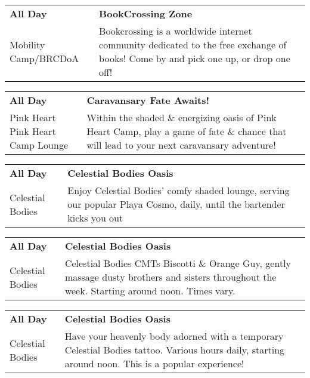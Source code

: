 \begin{tabular}{ p{1in} p{2.2in} }
    \textbf{All Day} & \textbf{BookCrossing Zone} \\
    Mobility Camp/BRCDoA \newline  & Bookcrossing is a worldwide internet community dedicated to the free exchange of books! Come by and pick one up, or drop one off! \\
    \hline 
\end{tabular}
    
\begin{tabular}{ p{1in} p{2.2in} }
    \textbf{All Day} & \textbf{Caravansary Fate Awaits!} \\
    Pink Heart \newline Pink Heart Camp Lounge & Within the shaded \& energizing oasis of Pink Heart Camp, play a game of fate \& chance that will lead to your next caravansary adventure! \\
    \hline 
\end{tabular}
    
\begin{tabular}{ p{1in} p{2.2in} }
    \textbf{All Day} & \textbf{Celestial Bodies Oasis} \\
    Celestial Bodies \newline  & Enjoy Celestial Bodies' comfy shaded lounge, serving our popular Playa Cosmo, daily, until the bartender kicks you out {\char9786} \\
    \hline 
\end{tabular}
    
\begin{tabular}{ p{1in} p{2.2in} }
    \textbf{All Day} & \textbf{Celestial Bodies Oasis} \\
    Celestial Bodies \newline  & Celestial Bodies CMTs Biscotti \& Orange Guy, gently massage dusty brothers and sisters throughout the week. Starting around noon. Times vary. \\
    \hline 
\end{tabular}
    
\begin{tabular}{ p{1in} p{2.2in} }
    \textbf{All Day} & \textbf{Celestial Bodies Oasis} \\
    Celestial Bodies \newline  & Have your heavenly body adorned with a temporary Celestial Bodies tattoo. Various hours daily, starting around noon. This is a popular experience! \\
    \hline 
\end{tabular}
    
